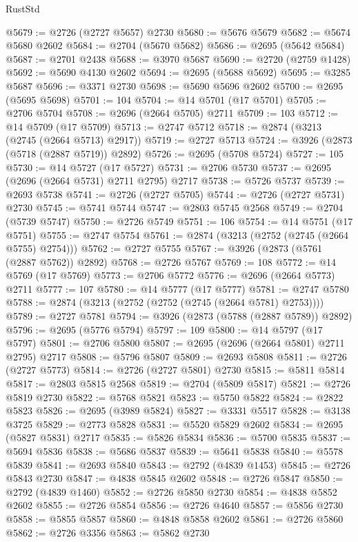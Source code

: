 \begin{lexlean}{RustStd}
\begin{coremodule}
@5679 := @2726 (@2727 @5657) @2730
@5680 := @5676 @5679
@5682 := @5674 @5680 @2602
@5684 := @2704 (@5670 @5682)
@5686 := @2695 (@5642 @5684)
@5687 := @2701 @2438
@5688 := @3970 @5687
@5690 := @2720 (@2759 @1428)
@5692 := @5690 @4130 @2602
@5694 := @2695 (@5688 @5692)
@5695 := @3285 @5687
@5696 := @3371 @2730
@5698 := @5690 @5696 @2602
@5700 := @2695 (@5695 @5698)
@5701 := 104
@5704 := @14 @5701 (@17 @5701)
@5705 := @2706 @5704
@5708 := @2696 (@2664 @5705) @2711
@5709 := 103
@5712 := @14 @5709 (@17 @5709)
@5713 := @2747 @5712
@5718 := @2874 (@3213 (@2745 (@2664 @5713) @2917))
@5719 := @2727 @5713
@5724 := @3926 (@2873 (@5718 (@2887 @5719)) @2892)
@5726 := @2695 (@5708 @5724)
@5727 := 105
@5730 := @14 @5727 (@17 @5727)
@5731 := @2706 @5730
@5737 := @2695 (@2696 (@2664 @5731) @2711 @2795) @2717
@5738 := @5726 @5737
@5739 := @2693 @5738
@5741 := @2726 (@2727 @5705)
@5744 := @2726 (@2727 @5731) @2730
@5745 := @5741 @5744
@5747 := @2803 @5745 @2568
@5749 := @2704 (@5739 @5747)
@5750 := @2726 @5749
@5751 := 106
@5754 := @14 @5751 (@17 @5751)
@5755 := @2747 @5754
@5761 := @2874 (@3213 (@2752 (@2745 (@2664 @5755) @2754)))
@5762 := @2727 @5755
@5767 := @3926 (@2873 (@5761 (@2887 @5762)) @2892)
@5768 := @2726 @5767
@5769 := 108
@5772 := @14 @5769 (@17 @5769)
@5773 := @2706 @5772
@5776 := @2696 (@2664 @5773) @2711
@5777 := 107
@5780 := @14 @5777 (@17 @5777)
@5781 := @2747 @5780
@5788 := @2874 (@3213 (@2752 (@2752 (@2745 (@2664 @5781) @2753))))
@5789 := @2727 @5781
@5794 := @3926 (@2873 (@5788 (@2887 @5789)) @2892)
@5796 := @2695 (@5776 @5794)
@5797 := 109
@5800 := @14 @5797 (@17 @5797)
@5801 := @2706 @5800
@5807 := @2695 (@2696 (@2664 @5801) @2711 @2795) @2717
@5808 := @5796 @5807
@5809 := @2693 @5808
@5811 := @2726 (@2727 @5773)
@5814 := @2726 (@2727 @5801) @2730
@5815 := @5811 @5814
@5817 := @2803 @5815 @2568
@5819 := @2704 (@5809 @5817)
@5821 := @2726 @5819 @2730
@5822 := @5768 @5821
@5823 := @5750 @5822
@5824 := @2822 @5823
@5826 := @2695 (@3989 @5824)
@5827 := @3331 @5517
@5828 := @3138 @3725
@5829 := @2773 @5828
@5831 := @5520 @5829 @2602
@5834 := @2695 (@5827 @5831) @2717
@5835 := @5826 @5834
@5836 := @5700 @5835
@5837 := @5694 @5836
@5838 := @5686 @5837
@5839 := @5641 @5838
@5840 := @5578 @5839
@5841 := @2693 @5840
@5843 := @2792 (@4839 @1453)
@5845 := @2726 @5843 @2730
@5847 := @4838 @5845 @2602
@5848 := @2726 @5847
@5850 := @2792 (@4839 @1460)
@5852 := @2726 @5850 @2730
@5854 := @4838 @5852 @2602
@5855 := @2726 @5854
@5856 := @2726 @4640
@5857 := @5856 @2730
@5858 := @5855 @5857
@5860 := @4848 @5858 @2602
@5861 := @2726 @5860
@5862 := @2726 @3356
@5863 := @5862 @2730

\end{coremodule}
\end{lexlean}
